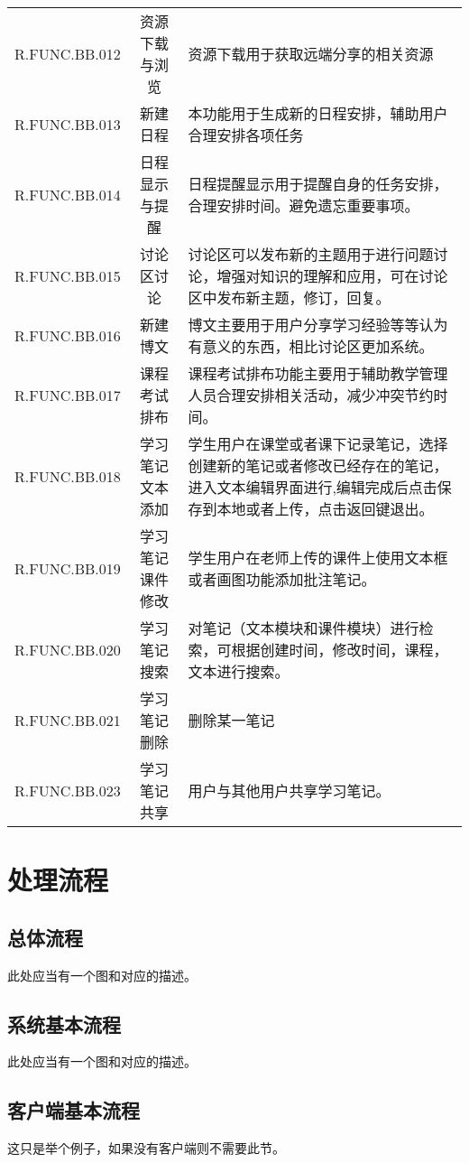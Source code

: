 \begin{longtable}{| c | c | p{7cm} |}
R.FUNC.BB.012   &   资源下载与浏览   &   资源下载用于获取远端分享的相关资源   \\
R.FUNC.BB.013   &   新建日程   &   本功能用于生成新的日程安排，辅助用户合理安排各项任务   \\
R.FUNC.BB.014   &   日程显示与提醒   &   日程提醒显示用于提醒自身的任务安排，合理安排时间。避免遗忘重要事项。   \\
R.FUNC.BB.015   &   讨论区讨论   &   讨论区可以发布新的主题用于进行问题讨论，增强对知识的理解和应用，可在讨论区中发布新主题，修订，回复。   \\
R.FUNC.BB.016   &   新建博文   &   博文主要用于用户分享学习经验等等认为有意义的东西，相比讨论区更加系统。   \\
R.FUNC.BB.017   &   课程考试排布   &   课程考试排布功能主要用于辅助教学管理人员合理安排相关活动，减少冲突节约时间。   \\
R.FUNC.BB.018   &   学习笔记文本添加   &    学生用户在课堂或者课下记录笔记，选择创建新的笔记或者修改已经存在的笔记，进入文本编辑界面进行,编辑完成后点击保存到本地或者上传，点击返回键退出。   \\
R.FUNC.BB.019   &   学习笔记课件修改   &   学生用户在老师上传的课件上使用文本框或者画图功能添加批注笔记。   \\
R.FUNC.BB.020   &   学习笔记搜索   &   对笔记（文本模块和课件模块）进行检索，可根据创建时间，修改时间，课程，文本进行搜索。   \\
R.FUNC.BB.021   &   学习笔记删除   &   删除某一笔记   \\
R.FUNC.BB.023   &   学习笔记共享   &   用户与其他用户共享学习笔记。 \\

\end{longtable}


\section{处理流程}
\subsection{总体流程}
此处应当有一个图和对应的描述。

\subsection{系统基本流程}
此处应当有一个图和对应的描述。

\subsection{客户端基本流程}
这只是举个例子，如果没有客户端则不需要此节。

